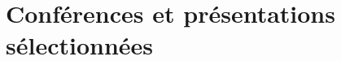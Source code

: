 \documentclass[11pt,a4paper,sans]{moderncv} %
\begin{document}








\section{Conférences et présentations sélectionnées}

\end{document}
